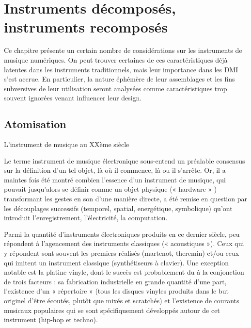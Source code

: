 %
\chapter{Instruments décomposés, instruments recomposés}
\label{ch:introduction}


Ce chapitre présente un certain nombre de considérations sur les instruments de musique numériques. On peut trouver certaines de ces caractéristiques déjà latentes dans les instruments traditionnels, mais leur importance dans les DMI s'est accrue. 
En particulier, la nature éphémère de leur assemblages et les fins subversives de leur utilisation seront analysées comme caractéristiques trop souvent ignorées venant influencer leur design.

\section{Atomisation}
\label{sec:introduction:atomisation}
L'instrument de musique au XXème siècle 

Le terme instrument de musique électronique sous-entend un préalable consensus sur la définition d’un tel objet, là où il commence, là ou il s’arrête. Or, il a maintes fois été montré combien l’essence d’un instrument de musique, qui pouvait jusqu’alors se définir comme un objet physique (« hardware » ) transformant les gestes en son d’une manière directe, a été remise en question par les découplages successifs (temporel, spatial, energétique, symbolique) qu’ont introduit l’enregistrement, l’électricité, la computation.

Parmi la quantité d’instruments électroniques produits en ce dernier siècle, peu répondent à l’agencement des instruments classiques (« acoustiques »). Ceux qui y répondent sont souvent les premiers réalisés (martenot, theremin) et/ou ceux qui imitent un instrument classique (synthétiseurs à clavier). Une exception notable est la platine vinyle, dont le succès est probablement du à la conjonction de trois facteurs : sa fabrication industrielle en grande quantité d’une part, l’existence d’un « répertoire » (tous les disques vinyles produits dans le but originel d’être écoutés, plutôt que mixés et scratchés) et l’existence de courants musicaux populaires qui se sont spécifiquement développés autour de cet instrument (hip-hop et techno). 

